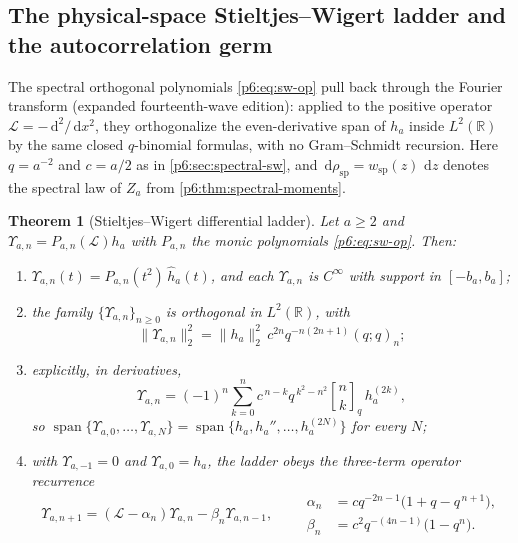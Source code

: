 \documentclass[11pt,oneside]{article}
\numberwithin{equation}{section}
\newtheorem{theorem}{Theorem}[section]
\theoremstyle{definition}
\theoremstyle{remark}
\newcommand{\R}{\mathbb R}
\newcommand{\dd}{\,\mathrm d}
\newcommand{\qbinom}[3]{\genfrac{[}{]}{0pt}{}{#1}{#2}_{#3}}
\begin{document}
\subsection{The physical-space Stieltjes--Wigert ladder and the autocorrelation germ}

The spectral orthogonal polynomials \eqref{p6:eq:sw-op} pull back through
the Fourier transform (expanded fourteenth-wave edition): applied to the
positive operator $\mathcal L=-\dd^2/\dd x^2$, they orthogonalize the
even-derivative span of $h_a$ inside $L^2(\R)$ by the same closed
$q$-binomial formulas, with no Gram--Schmidt recursion.  Here $q=a^{-2}$
and $c=a/2$ as in \cref{p6:sec:spectral-sw}, and
$\dd\rho_{\mathrm{sp}}=w_{\mathrm{sp}}(z)\,\dd z$ denotes the spectral law
of $Z_a$ from \cref{p6:thm:spectral-moments}.

\begin{theorem}[Stieltjes--Wigert differential ladder]\label{p6:thm:sw-ladder}
Let $a\ge2$ and $\Upsilon_{a,n}=P_{a,n}(\mathcal L)h_a$ with $P_{a,n}$ the
monic polynomials \eqref{p6:eq:sw-op}.  Then:
\begin{enumerate}
\item $\widehat{\Upsilon_{a,n}}(t)=P_{a,n}(t^2)\,\widehat h_a(t)$, and each
$\Upsilon_{a,n}$ is $C^\infty$ with support in $[-b_a,b_a]$;
\item the family $\{\Upsilon_{a,n}\}_{n\ge0}$ is orthogonal in $L^2(\R)$,
with
\begin{equation}\label{p6:eq:sw-ladder-norm}
 \|\Upsilon_{a,n}\|_2^2
 =\|h_a\|_2^2\,c^{2n}q^{-n(2n+1)}(q;q)_n;
\end{equation}
\item explicitly, in derivatives,
\begin{equation}\label{p6:eq:sw-ladder-expansion}
 \boxed{\ \Upsilon_{a,n}
 =(-1)^n\sum_{k=0}^{n}c^{\,n-k}q^{\,k^2-n^2}\qbinom nkq\,h_a^{(2k)},\ }
\end{equation}
so $\operatorname{span}\{\Upsilon_{a,0},\ldots,\Upsilon_{a,N}\}
=\operatorname{span}\{h_a,h_a'',\ldots,h_a^{(2N)}\}$ for every $N$;
\item with $\Upsilon_{a,-1}=0$ and $\Upsilon_{a,0}=h_a$, the ladder obeys
the three-term operator recurrence
\begin{equation}\label{p6:eq:sw-ladder-recurrence}
 \Upsilon_{a,n+1}
 =(\mathcal L-\alpha_n)\Upsilon_{a,n}-\beta_n\Upsilon_{a,n-1},
 \qquad
 \begin{aligned}
 \alpha_n&=cq^{-2n-1}\bigl(1+q-q^{\,n+1}\bigr),\\
 \beta_n&=c^2q^{-(4n-1)}\bigl(1-q^n\bigr).
 \end{aligned}
\end{equation}
\end{enumerate}
\end{theorem}
\end{document}
